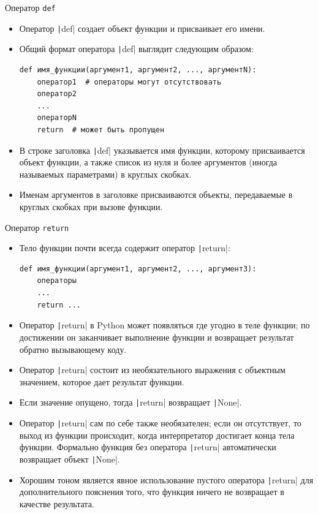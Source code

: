 \documentclass[aspectratio=169]{beamer}%
\begin{document}
\begin{frame}[fragile]{Оператор \texttt{def}}

\scriptsize
\begin{itemize}
\item Оператор \texttt|def| создает объект функции и присваивает его имени. 
\item Общий формат оператора \texttt|def| выглядит следующим образом:

\begin{verbatim}
def имя_функции(аргумент1, аргумент2, ..., аргументN):
    оператор1  # операторы могут отсутствовать
    оператор2
    ...
    операторN
    return  # может быть пропущен
\end{verbatim}
\item В строке заголовка \texttt|def| указывается имя функции, которому присваивается объект функции, а также список из нуля и более аргументов (иногда называемых параметрами) в круглых скобках. 
\item Именам аргументов в заголовке присваиваются объекты, передаваемые в круглых скобках при вызове функции.

\end{itemize}
\vfill
\end{frame}


\begin{frame}[fragile]{Оператор \texttt{return}}
\scriptsize
\begin{itemize}
\item Тело функции почти всегда содержит оператор \texttt|return|:
\begin{verbatim}
def имя_функции(аргумент1, аргумент2, ..., аргумент3):
    операторы
    ...
    return ...
\end{verbatim}
\item Оператор \texttt|return| в Python может появляться где угодно в теле функции; по достижении он заканчивает выполнение функции и возвращает результат обратно вызывающему коду. 
\item Оператор \texttt|return| состоит из необязательного выражения с объектным значением, которое дает результат функции. 
\item Если значение опущено, тогда \texttt|return| возвращает \texttt|None|. 
\item Оператор \texttt|return| сам по себе также необязателен; если он отсутствует, то выход из функции происходит, когда  интерпретатор достигает конца тела функции. Формально функция без оператора \texttt|return| автоматически возвращает объект \texttt|None|. 
\item Хорошим тоном является явное использование пустого оператора \texttt|return| для дополнительного пояснения того, что функция ничего не возвращает в качестве результата.
\end{itemize}
\vfill
\end{frame}
\end{document}
